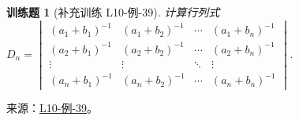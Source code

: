 \documentclass[12pt,fontset=fandol]{ctexart}
\newtheorem{exercise}{训练题}[section]
\begin{document}
\begin{exercise}[补充训练 L10-例-39]\label{prob:L10-例-39}
计算行列式 $D_n=\begin{vmatrix}
            (a_1+b_1)^{-1} & (a_1+b_2)^{-1} & \cdots & (a_1+b_n)^{-1} \\
            (a_2+b_1)^{-1} & (a_2+b_2)^{-1} & \cdots & (a_2+b_n)^{-1} \\
            \vdots         & \vdots         & \ddots & \vdots         \\
            (a_n+b_1)^{-1} & (a_n+b_2)^{-1} & \cdots & (a_n+b_n)^{-1}
        \end{vmatrix}$.
\end{exercise}
\noindent 来源：\href{https://github.com/yhwu-is/Linear-Algebra-Left-Undone/blob/new/%E8%AE%B2%E4%B9%89/%E4%B8%93%E9%A2%98/10%20%E8%A1%8C%E5%88%97%E5%BC%8F.tex}{L10-例-39}。
\end{document}
